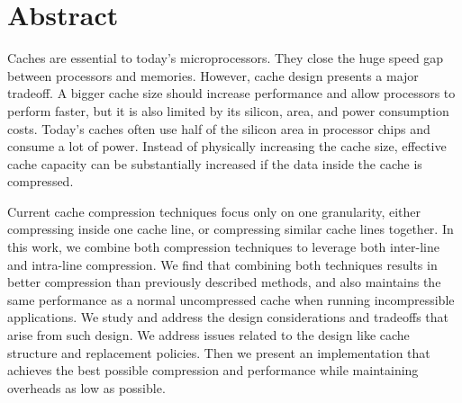 
\chapter{Abstract}
Caches are essential to today's microprocessors. They close the huge speed gap between processors and memories. However, cache design presents a major tradeoff. A bigger cache size should increase performance and allow processors to perform faster, but it is also limited by its silicon, area, and power consumption costs. Today's caches often use half of the silicon area in processor chips and consume a lot of power. Instead of physically increasing the cache size, effective cache capacity can be substantially increased if the data inside the cache is compressed.\par
Current cache compression techniques focus only on one granularity, either compressing inside one cache line, or compressing similar cache lines together. In this work, we combine both compression techniques to leverage both inter-line and intra-line compression. We find that combining both techniques results in better compression than previously described methods, and also maintains the same performance as a normal uncompressed cache when running incompressible applications. We study and address the design considerations and tradeoffs that arise from such design. We address issues related to the design like cache structure and replacement policies. Then we present an implementation that achieves the best possible compression and performance while maintaining overheads as low as possible.

